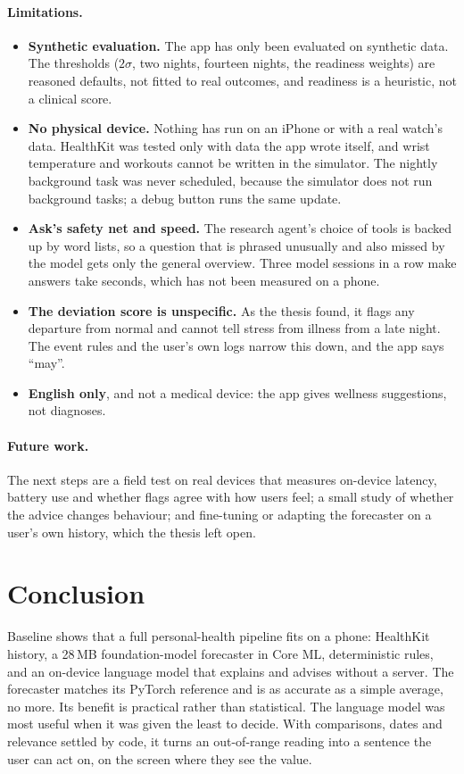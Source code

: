 \documentclass[11pt,a4paper]{article}
\begin{document}
\paragraph{Limitations.}
\begin{itemize}
  \item \textbf{Synthetic evaluation.} The app has only been evaluated on synthetic data. The thresholds ($2\sigma$, two nights, fourteen nights, the readiness weights) are reasoned defaults, not fitted to real outcomes, and readiness is a heuristic, not a clinical score.
  \item \textbf{No physical device.} Nothing has run on an iPhone or with a real watch's data. HealthKit was tested only with data the app wrote itself, and wrist temperature and workouts cannot be written in the simulator. The nightly background task was never scheduled, because the simulator does not run background tasks; a debug button runs the same update.
  \item \textbf{Ask's safety net and speed.} The research agent's choice of tools is backed up by word lists, so a question that is phrased unusually and also missed by the model gets only the general overview. Three model sessions in a row make answers take seconds, which has not been measured on a phone.
  \item \textbf{The deviation score is unspecific.} As the thesis found, it flags any departure from normal and cannot tell stress from illness from a late night. The event rules and the user's own logs narrow this down, and the app says ``may''.
  \item \textbf{English only}, and not a medical device: the app gives wellness suggestions, not diagnoses.
\end{itemize}

\paragraph{Future work.} The next steps are a field test on real devices that measures on-device latency, battery use and whether flags agree with how users feel; a small study of whether the advice changes behaviour; and fine-tuning or adapting the forecaster on a user's own history, which the thesis left open.

\section{Conclusion}

Baseline shows that a full personal-health pipeline fits on a phone: HealthKit history, a 28\,MB foundation-model forecaster in Core ML, deterministic rules, and an on-device language model that explains and advises without a server. The forecaster matches its PyTorch reference and is as accurate as a simple average, no more. Its benefit is practical rather than statistical. The language model was most useful when it was given the least to decide. With comparisons, dates and relevance settled by code, it turns an out-of-range reading into a sentence the user can act on, on the screen where they see the value.



\end{document}

